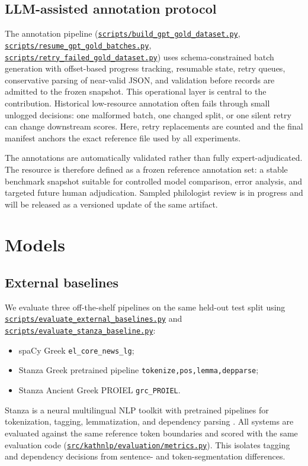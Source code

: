 \documentclass[11pt]{article}
\newcommand{\repobase}{https://github.com/gmikros/katharevousa-nlp-tooling}
\newcommand{\repofile}[1]{\href{\repobase/blob/main/#1}{\nolinkurl{#1}}}
\begin{document}
\subsection{LLM-assisted annotation protocol}

The annotation pipeline (\repofile{scripts/build_gpt_gold_dataset.py}, \repofile{scripts/resume_gpt_gold_batches.py}, \repofile{scripts/retry_failed_gold_dataset.py}) uses schema-constrained batch generation with offset-based progress tracking, resumable state, retry queues, conservative parsing of near-valid JSON, and validation before records are admitted to the frozen snapshot. This operational layer is central to the contribution. Historical low-resource annotation often fails through small unlogged decisions: one malformed batch, one changed split, or one silent retry can change downstream scores. Here, retry replacements are counted and the final manifest anchors the exact reference file used by all experiments.

The annotations are automatically validated rather than fully expert-adjudicated. The resource is therefore defined as a frozen reference annotation set: a stable benchmark snapshot suitable for controlled model comparison, error analysis, and targeted future human adjudication. Sampled philologist review is in progress and will be released as a versioned update of the same artifact.

\section{Models}

\subsection{External baselines}

We evaluate three off-the-shelf pipelines on the same held-out test split using \repofile{scripts/evaluate_external_baselines.py} and \repofile{scripts/evaluate_stanza_baseline.py}:

\begin{itemize}[leftmargin=1.5em]
  \item spaCy Greek \texttt{el\_core\_news\_lg};
  \item Stanza Greek pretrained pipeline \texttt{tokenize,pos,lemma,depparse};
  \item Stanza Ancient Greek PROIEL \texttt{grc\_PROIEL}.
\end{itemize}

Stanza is a neural multilingual NLP toolkit with pretrained pipelines for tokenization, tagging, lemmatization, and dependency parsing \cite{qi2020stanza}. All systems are evaluated against the same reference token boundaries and scored with the same evaluation code (\repofile{src/kathnlp/evaluation/metrics.py}). This isolates tagging and dependency decisions from sentence- and token-segmentation differences.
\end{document}
